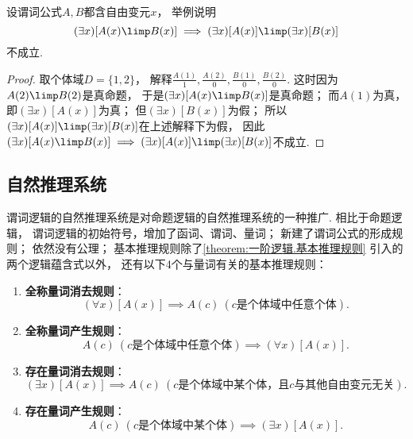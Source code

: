 \begin{example}
设谓词公式\(A,B\)都含自由变元\(x\)，
举例说明\begin{equation*}
	(\exists x)[A(x) \limp B(x)] \implies (\exists x)[A(x)] \limp (\exists x)[B(x)]
\end{equation*}不成立.
\begin{proof}
取个体域\(D = \{1,2\}\)，
解释\(
	\frac{A(1)}1,
	\frac{A(2)}0,
	\frac{B(1)}0,
	\frac{B(2)}0
\).
这时因为\(A(2) \limp B(2)\)是真命题，
于是\((\exists x)[A(x) \limp B(x)]\)是真命题；
而\(A(1)\)为真，
即\((\exists x)[A(x)]\)为真；
但\((\exists x)[B(x)]\)为假；
所以\((\exists x)[A(x)] \limp (\exists x)[B(x)]\)在上述解释下为假，
因此\((\exists x)[A(x) \limp B(x)] \implies (\exists x)[A(x)] \limp (\exists x)[B(x)]\)不成立.
\end{proof}
\end{example}

\subsection{自然推理系统}
谓词逻辑的自然推理系统是对命题逻辑的自然推理系统的一种推广.
相比于命题逻辑，
谓词逻辑的初始符号，增加了函词、谓词、量词；
新建了谓词公式的形成规则；
依然没有公理；
基本推理规则除了\cref{theorem:一阶逻辑.基本推理规则} 引入的两个逻辑蕴含式以外，
还有以下4个与量词有关的基本推理规则：\begin{enumerate}
	\item {\rm\bf 全称量词消去规则}：\begin{equation*}
		(\forall x)[A(x)] \implies A(c)\ (\text{$c$是个体域中任意个体}).
	\end{equation*}

	\item {\rm\bf 全称量词产生规则}：\begin{equation*}
		A(c)\ (\text{$c$是个体域中任意个体}) \implies (\forall x)[A(x)].
	\end{equation*}

	\item {\rm\bf 存在量词消去规则}：\begin{equation*}
		(\exists x)[A(x)] \implies A(c)\ (\text{$c$是个体域中某个体，且$c$与其他自由变元无关}).
	\end{equation*}

	\item {\rm\bf 存在量词产生规则}：\begin{equation*}
		A(c)\ (\text{$c$是个体域中某个体}) \implies (\exists x)[A(x)].
	\end{equation*}
\end{enumerate}

